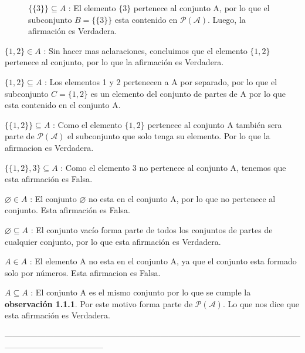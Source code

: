 \documentclass[10pt]{article}
\begin{document}
\begin{ej}
\begin{itemize}
\begin{figure}[H]
\begin{minipage}[b]{0.5\linewidth}
\item[iv)] $\{\{3\}\} \subseteq A$ : \sffamily El elemento $\{3\}$ pertenece al conjunto A, por lo que el subconjunto $B=\{\{3\}\}$ esta contenido en $\mathcal{P(A)}$. Luego, la afirmación es \textcolor{G}{Verdadera}.  
\end{minipage}
\end{figure}
\item[v)] $\{1,2\} \in A$ : \sffamily Sin hacer mas aclaraciones, concluimos que el elemento $\{1,2\}$ pertenece al conjunto, por lo que la afirmación es \textcolor{G}{Verdadera}.
\item[vi)] $\{1,2\} \subseteq A$ : \sffamily Los elementos 1 y 2 pertenecen a A por separado, por lo que el subconjunto $C=\{1,2\}$ es un elemento del conjunto de partes de A por lo que esta contenido en el conjunto A.
\item[vii)] $\{\{1,2\}\} \subseteq A$ : Como el elemento $\{1,2\}$ pertenece al conjunto A también sera parte de $\mathcal{P(A)}$ el subconjunto que solo tenga su elemento. Por lo que la afirmacion es  \textcolor{G}{Verdadera}.
\item[viii)] $\{\{1,2\},3\} \subseteq A$ : Como el elemento 3 no pertenece al conjunto A, tenemos que esta afirmación es \textcolor{R}{Falsa}. 
\item[ix)] $\varnothing \in A$ : El conjunto $\varnothing$ no esta en el conjunto A, por lo que no pertenece al conjunto. Esta afirmación es \textcolor{R}{Falsa}.
\item[x)] $\varnothing \subseteq A$ : El conjunto vacío forma parte de todos los conjuntos de partes de cualquier conjunto, por lo que esta afirmación es \textcolor{G}{Verdadera}.
\item[xi)] $A \in A$ : El elemento A no esta en el conjunto A, ya que el conjunto esta formado solo por números. Esta afirmacion es \textcolor{R}{Falsa}.
\item[xii)] $A \subseteq A$ : El conjunto A es el mismo conjunto por lo que se cumple la \textbf{observación 1.1.1}. Por este motivo forma parte de $\mathcal{P(A)}$. Lo que nos dice que esta afirmación es \textcolor{G}{Verdadera}.
\end{itemize}
\end{ej}
------------------------------------------------------------------------------------------------------------------------------------------------
\end{document}
